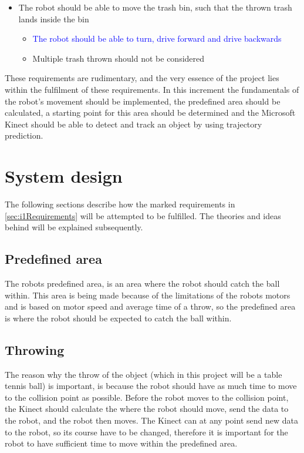 \begin{itemize}
\begin{itemize}
\end{itemize}
\item The robot should be able to move the trash bin, such that the thrown trash lands inside the bin
\begin{itemize}
\item \textcolor{blue}{The robot should be able to turn, drive forward and drive backwards}
\item Multiple trash thrown should not be considered
\end{itemize}
\end{itemize}

These requirements are rudimentary, and the very essence of the project lies within the fulfilment of these requirements. In this increment the fundamentals of the robot’s movement should be implemented, the predefined area should be calculated, a starting point for this area should be determined and the Microsoft Kinect should be able to detect and track an object by using trajectory prediction.

\section{System design}
\label{sec:i1System Design}
The following sections describe how the marked requirements in \ref{sec:i1Requirements} will be attempted to be fulfilled. The theories and ideas behind will be explained subsequently.

\subsection{Predefined area}
\label{sec:i1Predefined area}
The robots predefined area, is an area where the robot should catch the ball within. This area is being made because of the limitations of the robots motors and is based on motor speed and average time of a throw, so the predefined area is where the robot should be expected to catch the ball within.

\subsection{Throwing}
\label{sec:i1Throwing}
The reason why the throw of the object (which in this project will be a table tennis ball) is important, is because the robot should have as much time to move to the collision point as possible. Before the robot moves to the collision point, the Kinect should calculate the where the robot should move, send the data to the robot, and the robot then moves. The Kinect can at any point send new data to the robot, so its course have to be changed, therefore it is important for the robot to have sufficient time to move within the predefined area.    

